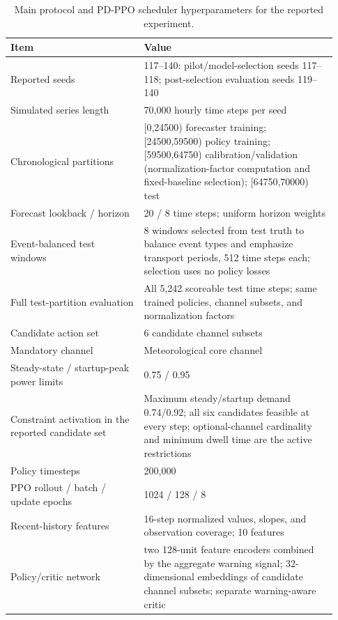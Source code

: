 \begin{table}[htbp]
  \centering
  \caption{Main protocol and PD-PPO scheduler hyperparameters for the reported experiment.}
  \label{tab:main_protocol_hyperparameters}
  \scriptsize
  \renewcommand{\arraystretch}{0.82}
  \setlength{\tabcolsep}{3.2pt}
  \begin{tabular}{@{}p{0.38\linewidth}p{0.55\linewidth}@{}}
    \toprule
    Item & Value \\
    \midrule
    Reported seeds & 117--140: pilot/model-selection seeds 117--118; post-selection evaluation seeds 119--140 \\
    Simulated series length & 70,000 hourly time steps per seed \\
    Chronological partitions & [0,24500) forecaster training; [24500,59500) policy training; [59500,64750) calibration/validation (normalization-factor computation and fixed-baseline selection); [64750,70000) test \\
    Forecast lookback / horizon & 20 / 8 time steps; uniform horizon weights \\
    Event-balanced test windows & 8 windows selected from test truth to balance event types and emphasize transport periods, 512 time steps each; selection uses no policy losses \\
    Full test-partition evaluation & All 5,242 scoreable test time steps; same trained policies, channel subsets, and normalization factors \\
    Candidate action set & 6 candidate channel subsets \\
    Mandatory channel & Meteorological core channel \\
    Steady-state / startup-peak power limits & 0.75 / 0.95 \\
    Constraint activation in the reported candidate set & Maximum steady/startup demand 0.74/0.92; all six candidates feasible at every step; optional-channel cardinality and minimum dwell time are the active restrictions \\
    Policy timesteps & 200,000 \\
    PPO rollout / batch / update epochs & 1024 / 128 / 8 \\
    Recent-history features & 16-step normalized values, slopes, and observation coverage; 10 features \\
    Policy/critic network & two 128-unit feature encoders combined by the aggregate warning signal; 32-dimensional embeddings of candidate channel subsets; separate warning-aware critic \\

\end{tabular}
\end{table}
